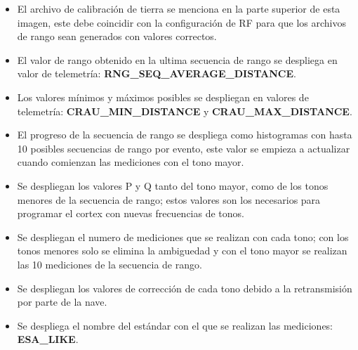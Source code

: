\documentclass[11pt]{article}
\providecommand{\tightlist}{%
      \setlength{\itemsep}{0pt}\setlength{\parskip}{0pt}}
\begin{document}
\begin{itemize}
\tightlist
\item
  El archivo de calibración de tierra se menciona en la parte superior
  de esta imagen, este debe coincidir con la configuración de RF para
  que los archivos de rango sean generados con valores correctos.
\item
  El valor de rango obtenido en la ultima secuencia de rango se
  despliega en valor de telemetría:
  \textbf{RNG\_SEQ\_AVERAGE\_DISTANCE}.
\item
  Los valores mínimos y máximos posibles se despliegan en valores de
  telemetría: \textbf{CRAU\_MIN\_DISTANCE} y
  \textbf{CRAU\_MAX\_DISTANCE}.
\item
  El progreso de la secuencia de rango se despliega como histogramas con
  hasta 10 posibles secuencias de rango por evento, este valor se
  empieza a actualizar cuando comienzan las mediciones con el tono
  mayor.
\item
  Se despliegan los valores P y Q tanto del tono mayor, como de los
  tonos menores de la secuencia de rango; estos valores son los
  necesarios para programar el cortex con nuevas frecuencias de tonos.
\item
  Se despliegan el numero de mediciones que se realizan con cada tono;
  con los tonos menores solo se elimina la ambiguedad y con el tono
  mayor se realizan las 10 mediciones de la secuencia de rango.
\item
  Se despliegan los valores de corrección de cada tono debido a la
  retransmisión por parte de la nave.
\item
  Se despliega el nombre del estándar con el que se realizan las
  mediciones: \textbf{ESA\_LIKE}.
\end{itemize}
\end{document}
